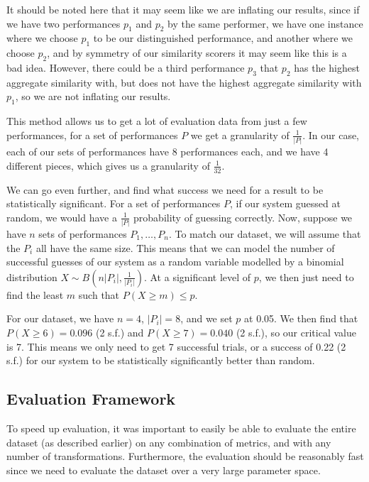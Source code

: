 \documentclass[oneside, class=book, 12pt, crop=false]{standalone}
\begin{document}
It should be noted here that it may seem like we are inflating our results, since if we have two performances $p_1$ and $p_2$ by the same performer, we have one instance where we choose $p_1$ to be our distinguished performance, and another where we choose $p_2$, and by symmetry of our similarity scorers it may seem like this is a bad idea. However, there could be a third performance $p_3$ that $p_2$ has the highest aggregate similarity with, but does not have the highest aggregate similarity with $p_1$, so we are not inflating our results.

This method allows us to get a lot of evaluation data from just a few performances, for a set of performances $P$ we get a granularity of $\frac{1}{|P|}$. In our case, each of our sets of performances have 8 performances each, and we have 4 different pieces, which gives us a granularity of $\frac{1}{32}$.

We can go even further, and find what success we need for a result to be statistically significant. For a set of performances $P$, if our system guessed at random, we would have a $\frac{1}{|P|}$ probability of guessing correctly. Now, suppose we have $n$ sets of performances $P_1, \ldots, P_n$. To match our dataset, we will assume that the $P_i$ all have the same size. This means that we can model the number of successful guesses of our system as a random variable modelled by a binomial distribution $X \sim B(n|P_i|, \frac{1}{|P_i|})$. At a significant level of $p$, we then just need to find the least $m$ such that $P(X \geq m) \leq p$.

For our dataset, we have $n=4$, $|P_i| = 8$, and we set $p$ at 0.05. We then find that $P(X \geq 6) = 0.096$ (2 s.f.) and $P(X \geq 7) = 0.040$ (2 s.f.), so our critical value is 7. This means we only need to get 7 successful trials, or a success of 0.22 (2 s.f.) for our system to be statistically significantly better than random.

\subsection{Evaluation Framework}\label{sec:evaluation framework}

To speed up evaluation, it was important to easily be able to evaluate the entire dataset (as described earlier) on any combination of metrics, and with any number of transformations. Furthermore, the evaluation should be reasonably fast since we need to evaluate the dataset over a very large parameter space.
\end{document}
